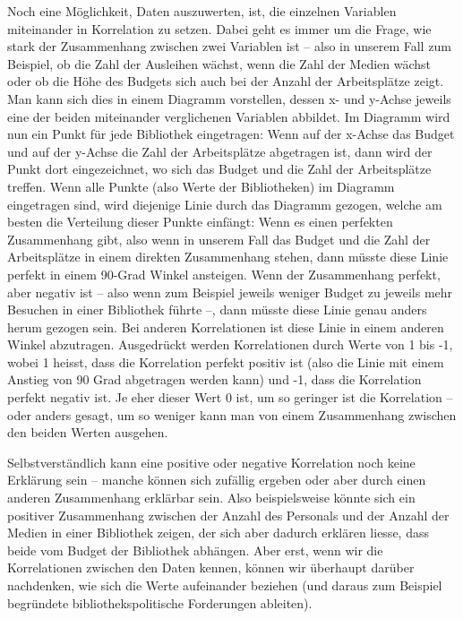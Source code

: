 \documentclass[a4paper,
fontsize=11pt,
oneside,
numbers=noperiodatend,
parskip=half-,
bibliography=totoc,
final
]{scrartcl}
\begin{document}
Noch eine Möglichkeit, Daten auszuwerten, ist, die einzelnen Variablen
miteinander in Korrelation zu setzen. Dabei geht es immer um die Frage,
wie stark der Zusammenhang zwischen zwei Variablen ist -- also in
unserem Fall zum Beispiel, ob die Zahl der Ausleihen wächst, wenn die
Zahl der Medien wächst oder ob die Höhe des Budgets sich auch bei der
Anzahl der Arbeitsplätze zeigt. Man kann sich dies in einem Diagramm
vorstellen, dessen x- und y-Achse jeweils eine der beiden miteinander
verglichenen Variablen abbildet. Im Diagramm wird nun ein Punkt für jede
Bibliothek eingetragen: Wenn auf der x-Achse das Budget und auf der
y-Achse die Zahl der Arbeitsplätze abgetragen ist, dann wird der Punkt
dort eingezeichnet, wo sich das Budget und die Zahl der Arbeitsplätze
treffen. Wenn alle Punkte (also Werte der Bibliotheken) im Diagramm
eingetragen sind, wird diejenige Linie durch das Diagramm gezogen,
welche am besten die Verteilung dieser Punkte einfängt: Wenn es einen
perfekten Zusammenhang gibt, also wenn in unserem Fall das Budget und
die Zahl der Arbeitsplätze in einem direkten Zusammenhang stehen, dann
müsste diese Linie perfekt in einem 90-Grad Winkel ansteigen. Wenn der
Zusammenhang perfekt, aber negativ ist -- also wenn zum Beispiel jeweils
weniger Budget zu jeweils mehr Besuchen in einer Bibliothek führte --,
dann müsste diese Linie genau anders herum gezogen sein. Bei anderen
Korrelationen ist diese Linie in einem anderen Winkel abzutragen.
Ausgedrückt werden Korrelationen durch Werte von 1 bis -1, wobei 1
heisst, dass die Korrelation perfekt positiv ist (also die Linie mit
einem Anstieg von 90 Grad abgetragen werden kann) und -1, dass die
Korrelation perfekt negativ ist. Je eher dieser Wert 0 ist, um so
geringer ist die Korrelation -- oder anders gesagt, um so weniger kann
man von einem Zusammenhang zwischen den beiden Werten ausgehen.

Selbstverständlich kann eine positive oder negative Korrelation noch
keine Erklärung sein -- manche können sich zufällig ergeben oder aber
durch einen anderen Zusammenhang erklärbar sein. Also beispielsweise
könnte sich ein positiver Zusammenhang zwischen der Anzahl des Personals
und der Anzahl der Medien in einer Bibliothek zeigen, der sich aber
dadurch erklären liesse, dass beide vom Budget der Bibliothek abhängen.
Aber erst, wenn wir die Korrelationen zwischen den Daten kennen, können
wir überhaupt darüber nachdenken, wie sich die Werte aufeinander
beziehen (und daraus zum Beispiel begründete bibliothekspolitische
Forderungen ableiten).
\end{document}
